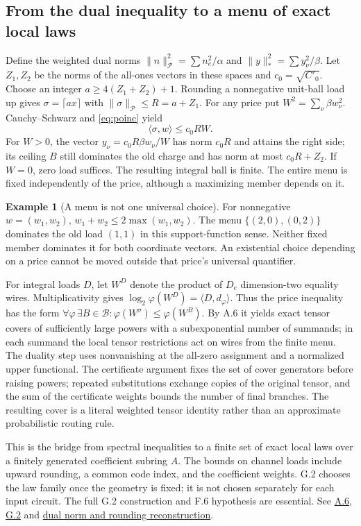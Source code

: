 \documentclass[11pt,letterpaper]{article}
\theoremstyle{definition}\newtheorem{definition}[theorem]{Definition}\newtheorem{example}[theorem]{Example}
\theoremstyle{remark}\newtheorem{remark}[theorem]{Remark}
\newcommand{\pub}[3]{\href{https://github.com/anthropics/formal-math/blob/11b6c7e3c927df2658f513b6b68ea7f8929c62c5/vp-vnp/#1\#L#2}{#3}}
\newcommand{\aud}[2]{\href{https://github.com/nousentllc/VP-VNP-Review/blob/567303d0bcf4f9d54390437b137752446e58ccd6/#1}{#2}}
\begin{document}
\subsection{From the dual inequality to a menu of exact local laws}\label{sec:laws}
Define the weighted dual norms $\|n\|_{\mathcal P}^2=\sum n_e^2/\alpha$ and $\|y\|_*^2=\sum y_\nu^2/\beta$. Let $Z_1,Z_2$ be the norms of the all-ones vectors in these spaces and $c_0=\sqrt{C'_0}$. Choose an integer $a\ge4(Z_1+Z_2)+1$. Rounding a nonnegative unit-ball load up gives $\sigma=\lceil ax\rceil$ with $\|\sigma\|_{\mathcal P}\le R=a+Z_1$. For any price put $W^2=\sum_{\nu}\beta w_\nu^2$. Cauchy--Schwarz and \eqref{eq:poinc} yield
\[
 \langle\sigma,w\rangle\le c_0RW.
\]
For $W>0$, the vector $y_\nu=c_0R\beta w_\nu/W$ has norm $c_0R$ and attains the right side; its ceiling $B$ still dominates the old charge and has norm at most $c_0R+Z_2$. If $W=0$, zero load suffices. The resulting integral ball is finite. The entire menu is fixed independently of the price, although a maximizing member depends on it.

\begin{example}[A menu is not one universal choice]
For nonnegative $w=(w_1,w_2)$, $w_1+w_2\le2\max(w_1,w_2)$. The menu $\{(2,0),(0,2)\}$ dominates the old load $(1,1)$ in this support-function sense. Neither fixed member dominates it for both coordinate vectors. An existential choice depending on a price cannot be moved outside that price's universal quantifier.
\end{example}
For integral loads $D$, let $W^D$ denote the product of $D_e$ dimension-two equality wires. Multiplicativity gives $\log_2\varphi(W^D)=\langle D,d_\varphi\rangle$. Thus the price inequality has the form $\forall\varphi\,\exists B\in\mathcal B:\varphi(W^\sigma)\le\varphi(W^B)$. By A.6 it yields exact tensor covers of sufficiently large powers with a subexponential number of summands; in each summand the local tensor restrictions act on wires from the finite menu. The duality step uses nonvanishing at the all-zero assignment and a normalized upper functional. The certificate argument fixes the set of cover generators before raising powers; repeated substitutions exchange copies of the original tensor, and the sum of the certificate weights bounds the number of final branches. The resulting cover is a literal weighted tensor identity rather than an approximate probabilistic routing rule.

This is the bridge from spectral inequalities to a finite set of exact local laws over a finitely generated coefficient subring $A$. The bounds on channel loads include upward rounding, a common code index, and the coefficient weights. G.2 chooses the law family once the geometry is fixed; it is not chosen separately for each input circuit. The full G.2 construction and F.6 hypothesis are essential. See \pub{Paper/Gauges.lean}{560}{A.6}, \pub{Paper/Laws.lean}{425}{G.2} and \aud{passes/pass13B-gain.md}{dual norm and rounding reconstruction}.
\end{document}

